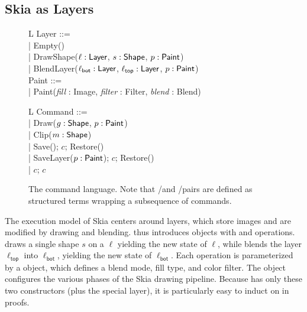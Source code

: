 \documentclass[main.tex]{subfiles}
\begin{document}
\subsection{Skia as Layers}
\label{subsec:sem-layers}

\begin{figure}
  \begin{minipage}{0.51\linewidth}
    \centering
    \begin{tabular}{L}
      Layer ::= \\
      | Empty() \\
      | DrawShape($\ell: \textsf{Layer}$, $s: \textsf{Shape}$, $p: \textsf{Paint}$) \\
      | BlendLayer($\ell_{\textsf{bot}}: \textsf{Layer}$, $\ell_{\textsf{top}}: \textsf{Layer}$, $p: \textsf{Paint}$) \\[4pt]

      Paint ::= \\
      | Paint(\textit{fill} : Image, \textit{filter} : Filter, \textit{blend} : Blend)
    \end{tabular}
    \caption{
      \Layer objects store images and are modified
        by drawing and blending operations.
      Each drawing or blending operation
        is parameterized by a \Paint object.
      \Layer terms denote to the abstract model
        of .
      }
    \label{fig:layerlang}
  \end{minipage}%
  \hfill%
  \begin{minipage}[T]{0.45\linewidth}
    \centering
    \begin{tabular}{L}
      Command ::= \\
      | Draw($g: \textsf{Shape}$, $p : \textsf{Paint}$) \\
      | Clip($m : \textsf{Shape}$) \\
      | Save(); $c$; Restore() \\
      | SaveLayer($p: \textsf{Paint}$); $c$; Restore() \\
      | $c$; $c$
    \end{tabular}
    \caption{The \muskia command language.
      Note that \Save/\Restore and \SaveLayer/\Restore pairs
        are defined as structured terms
        wrapping a subsequence of commands.
      }
    \label{fig:muskia}
  \end{minipage}
\end{figure}

The execution model of Skia centers around layers,
  which store images
  and are modified by drawing and blending.
 thus introduces \Layer objects
  with \DrawShape and \BlendLayer operations.
\DrawShape draws a single shape $s$ on a \Layer $\ell$
  yielding the new state of $\ell$,
  while \BlendLayer blends the layer $\ell_\textsf{top}$
  into $\ell_\textsf{bot}$, yielding the new state of $\ell_\textsf{bot}$.
Each operation is parameterized by a \Paint object,
  which defines a blend mode, fill type, and color filter.
The \Paint object configures the various phases
  of the Skia drawing pipeline.
Because \Layer has only these two constructors
  (plus the special \Empty layer),
  it is particularly easy to induct on in proofs.
\end{document}
